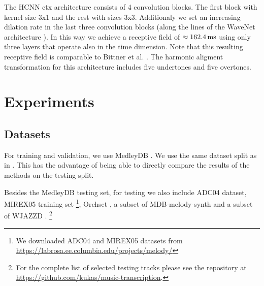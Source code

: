 \documentclass{article}
\begin{document}
The HCNN ctx architecture consists of 4 convolution blocks. The first block with kernel size 3x1 and the rest with sizes 3x3. Additionaly we set an increasing dilation rate in the last three convolution blocks (along the lines of the WaveNet architecture \cite{Oord2016}). In this way we achieve a receptive field of $\approx 162.4\,\rm ms$ using only three layers that operate also in the time dimension. Note that this resulting receptive field is comparable to Bittner et al. \cite{Bittner2017}. The harmonic aligment transformation for this architecture includes five undertones and five overtones.

\begin{table}
\centering
{}%
\caption{Comparison of the number of model parameters.}\label{tab:model_parametes}
\end{table}

\section{Experiments}

\subsection{Datasets}

For training and validation, we use MedleyDB \cite{Bittner2014}. We use the same dataset split as in \cite{DBasaranSEssid2018,Bittner2017}. This has the advantage of being able to directly compare the results of the methods on the testing split. 

Besides the MedleyDB testing set, for testing we also include ADC04 dataset, MIREX05 training set \footnote{We downloaded ADC04 and MIREX05 datasets from \url{https://labrosa.ee.columbia.edu/projects/melody/}}, Orchset \cite{Bosch2016}, a subset of MDB-melody-synth \cite{Salamon2017} and a subset of WJAZZD \cite{Pfleiderer}. \footnote{For the complete list of selected testing tracks please see the repository at \url{https://github.com/kukas/music-transcription}.}
\end{document}
